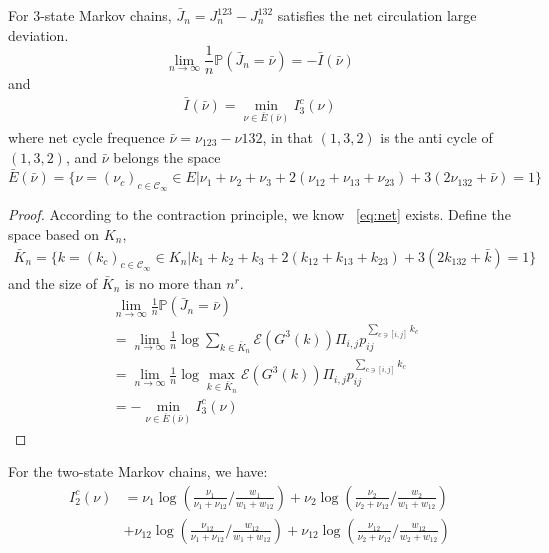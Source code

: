 \documentclass[11pt,en,cite=authoryear]{elegantpaper}
\begin{document}
\begin{corollary}
    For 3-state Markov chains, $\bar{J}_n = J^{123}_n - J^{132}_n$ satisfies the net circulation large deviation.
    \begin{equation*} \label{eq:net}
        \lim_{n \rightarrow \infty} \frac{1}{n} \mathbb{P}(\bar{J}_n = \bar{\nu}) = - \bar{I}(\bar{\nu})
    \end{equation*}
    and
    \begin{align*}
        \bar{I}(\bar{\nu}) = \min_{\nu \in \bar{E}(\bar{\nu})} I^c_3(\nu)
    \end{align*}
    where net cycle frequence $\bar{\nu} = \nu_{123} - \nu{132}$, in that $(1,3,2)$ is the anti cycle of $(1,3,2)$, and $\bar{\nu}$ belongs the space
    $\bar{E}(\bar{\nu}) = \{\nu = (\nu_c)_{c \in \mathcal{C}_{\infty}} \in E | \nu_1 +\nu_2 +\nu_3 +2(\nu_{12} +\nu_{13} +\nu_{23}) +3(2\nu_{132} +\bar{\nu})=1\}$
\end{corollary}
\begin{proof}
    According to the contraction principle, we know ~\ref{eq:net} exists.
    Define the space based on $K_n$,
    \begin{align*}
        \bar{K}_n = \{k = (k_c)_{c \in \mathcal{C}_{\infty}} \in K_n| k_1 + k_2 +k_3 +2(k_{12} +k_{13} +k_{23}) +3(2k_{132} +\bar{k})=1\}
    \end{align*}
    and the size of $\bar{K}_n$ is no more than $n^r$.
    \begin{align*}
        &\lim_{n \rightarrow \infty} \frac{1}{n} \mathbb{P}(\bar{J}_n = \bar{\nu}) \\
        &= \lim_{n \rightarrow \infty} \frac{1}{n} \log \sum_{k \in \bar{K}_n} \mathcal{E} (G^3(k)) \Pi_{i, j} p_{ij}^{\sum_{c \ni [i,j]} k_{c}} \\
        &= \lim_{n \rightarrow \infty} \frac{1}{n} \log \max_{k \in \bar{K}_n} \mathcal{E} (G^3(k)) \Pi_{i, j} p_{ij}^{\sum_{c \ni [i,j]} k_{c}} \\
        &= - \min_{\nu \in \bar{E}(\bar{\nu})} I^c_3(\nu)
    \end{align*}
\end{proof}

\begin{corollary}
    For the two-state Markov chains, we have:
    \begin{align*}
    I_2^c(\nu) 
    &= \nu_{1}\log(\frac{\nu_{1}}{\nu_{1}+\nu_{12}}/\frac{w_{1}}{w_{1}+w_{12}}) 
    + \nu_{2} \log(\frac{\nu_{2}}{\nu_{2}+\nu_{12}}/\frac{w_{2}}{w_{1}+w_{12}}) \\
    &+ \nu_{12} \log (\frac{\nu_{12}}{\nu_{1}+\nu_{12}}/\frac{w_{12}}{w_{1}+w_{12}})
    + \nu_{12} \log (\frac{\nu_{12}}{\nu_{2}+\nu_{12}}/\frac{w_{12}}{w_{2}+w_{12}})
\end{align*}
\end{corollary}
\end{document}
